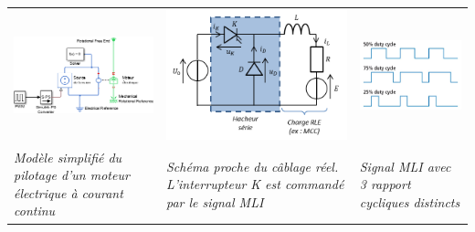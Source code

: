 \begin{tabular}{p{.3\linewidth}p{.3\linewidth}p{.3\linewidth}}
\includegraphics[width=.9\linewidth]{media/image104.png} &
\includegraphics[width=.9\linewidth]{media/image105.png} &
\includegraphics[width=.9\linewidth]{media/image106.png} \\
\emph{Modèle simplifié du pilotage d'un moteur électrique à courant
continu} & \emph{Schéma proche du câblage réel. L'interrupteur K est
commandé par le signal MLI} & \emph{Signal MLI avec 3 rapport cycliques
distincts} \\
\end{tabular}

